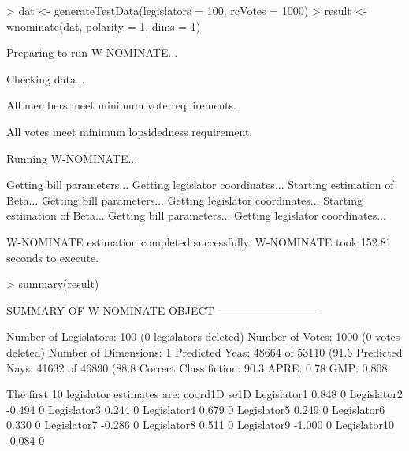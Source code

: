 \documentclass[12pt]{article}
\begin{document}
\begin{Schunk}
\begin{Sinput}
> dat <- generateTestData(legislators = 100, rcVotes = 1000)
> result <- wnominate(dat, polarity = 1, dims = 1)
\end{Sinput}
\begin{Soutput}
Preparing to run W-NOMINATE...

	Checking data...

		All members meet minimum vote requirements.

		All votes meet minimum lopsidedness requirement.

	Running W-NOMINATE...

		Getting bill parameters...
		Getting legislator coordinates...
		Starting estimation of Beta...
		Getting bill parameters...
		Getting legislator coordinates...
		Starting estimation of Beta...
		Getting bill parameters...
		Getting legislator coordinates...


W-NOMINATE estimation completed successfully.
W-NOMINATE took 152.81 seconds to execute.
\end{Soutput}
\begin{Sinput}
> summary(result)
\end{Sinput}
\begin{Soutput}
SUMMARY OF W-NOMINATE OBJECT
----------------------------

Number of Legislators:	  100 (0 legislators deleted)
Number of Votes:	  1000 (0 votes deleted)
Number of Dimensions:	  1
Predicted Yeas:		  48664 of 53110 (91.6%
Predicted Nays:		  41632 of 46890 (88.8%
Correct Classifiction:	  90.3%
APRE:			  0.78
GMP:			  0.808 


The first 10 legislator estimates are:
             coord1D se1D
Legislator1    0.848    0
Legislator2   -0.494    0
Legislator3    0.244    0
Legislator4    0.679    0
Legislator5    0.249    0
Legislator6    0.330    0
Legislator7   -0.286    0
Legislator8    0.511    0
Legislator9   -1.000    0
Legislator10  -0.084    0
\end{Soutput}
\end{Schunk}
\end{document}
